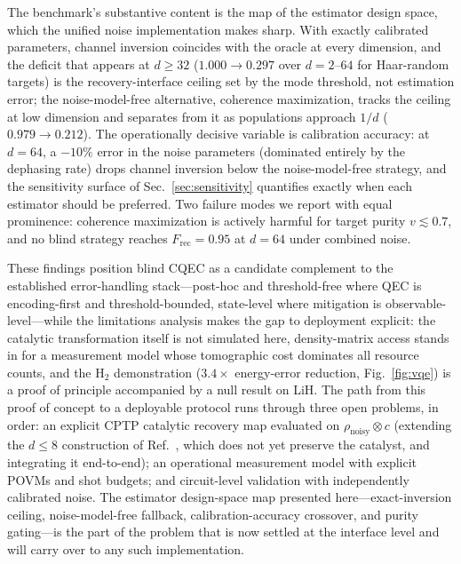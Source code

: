 \documentclass[12pt,a4paper]{article}
\newcommand{\Frec}{F_\mathrm{rec}}
\newcommand{\rhon}{\rho_\mathrm{noisy}}
\begin{document}
The benchmark's substantive content is the map of the estimator design space, which the unified noise implementation makes sharp.
With exactly calibrated parameters, channel inversion coincides with the oracle at every dimension, and the deficit that appears at $d \geq 32$ ($1.000 \to 0.297$ over $d = 2$--$64$ for Haar-random targets) is the recovery-interface ceiling set by the mode threshold, not estimation error; the noise-model-free alternative, coherence maximization, tracks the ceiling at low dimension and separates from it as populations approach $1/d$ ($0.979 \to 0.212$).
The operationally decisive variable is calibration accuracy: at $d = 64$, a $-10\%$ error in the noise parameters (dominated entirely by the dephasing rate) drops channel inversion below the noise-model-free strategy, and the sensitivity surface of Sec.~\ref{sec:sensitivity} quantifies exactly when each estimator should be preferred.
Two failure modes we report with equal prominence: coherence maximization is actively harmful for target purity $v \lesssim 0.7$, and no blind strategy reaches $\Frec = 0.95$ at $d = 64$ under combined noise.

These findings position blind CQEC as a candidate complement to the established error-handling stack---post-hoc and threshold-free where QEC is encoding-first and threshold-bounded, state-level where mitigation is observable-level---while the limitations analysis makes the gap to deployment explicit: the catalytic transformation itself is not simulated here, density-matrix access stands in for a measurement model whose tomographic cost dominates all resource counts, and the H$_2$ demonstration ($3.4\times$ energy-error reduction, Fig.~\ref{fig:vqe}) is a proof of principle accompanied by a null result on LiH.
The path from this proof of concept to a deployable protocol runs through three open problems, in order: an explicit CPTP catalytic recovery map evaluated on $\rhon \otimes c$ (extending the $d \leq 8$ construction of Ref.~\cite{Wakaura2026unified}, which does not yet preserve the catalyst, and integrating it end-to-end); an operational measurement model with explicit POVMs and shot budgets; and circuit-level validation with independently calibrated noise.
The estimator design-space map presented here---exact-inversion ceiling, noise-model-free fallback, calibration-accuracy crossover, and purity gating---is the part of the problem that is now settled at the interface level and will carry over to any such implementation.


\end{document}

